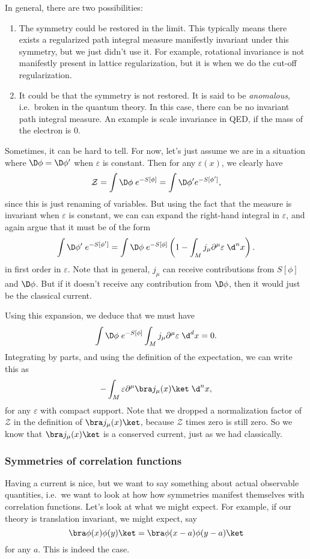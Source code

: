 \documentclass[a4paper]{article}
\begin{document}
In general, there are two possibilities:
\begin{enumerate}
  \item The symmetry could be restored in the limit. This typically means there exists a regularized path integral measure manifestly invariant under this symmetry, but we just didn't use it. For example, rotational invariance is not manifestly present in lattice regularization, but it is when we do the cut-off regularization.
  \item It could be that the symmetry is not restored. It is said to be \emph{anomalous}, i.e.\ broken in the quantum theory. In this case, there can be no invariant path integral measure. An example is scale invariance in QED, if the mass of the electron is $0$.
\end{enumerate}
Sometimes, it can be hard to tell. For now, let's just assume we are in a situation where $\D \phi = \D \phi'$ when $\varepsilon$ is constant. Then for any $\varepsilon(x)$, we clearly have
\[
  \mathcal{Z} = \int \D \phi\; e^{-S [\phi]} = \int \D \phi' e^{-S[\phi']},
\]
since this is just renaming of variables. But using the fact that the measure is invariant when $\varepsilon$ is constant, we can can expand the right-hand integral in $\varepsilon$, and again argue that it must be of the form
\[
  \int \D \phi'\; e^{-S[\phi']} = \int \D \phi\; e^{-S[\phi]} \left(1 - \int_M j_\mu \partial^\mu \varepsilon\; \d^n x\right).
\]
in first order in $\varepsilon$. Note that in general, $j_\mu$ can receive contributions from $S[\phi]$ and $\D \phi$. But if it doesn't receive any contribution from $\D \phi$, then it would just be the classical current.

Using this expansion, we deduce that we must have
\[
  \int \D \phi \; e^{-S[\phi]} \int_M j_\mu \partial^\mu \varepsilon \;\d^d x = 0.
\]
Integrating by parts, and using the definition of the expectation, we can write this as
\[
  -\int_M \varepsilon \partial^\mu \bra j_\mu (x)\ket\; \d^n x,
\]
for any $\varepsilon$ with compact support. Note that we dropped a normalization factor of $\mathcal{Z}$ in the definition of $\bra j_\mu(x)\ket$, because $\mathcal{Z}$ times zero is still zero. So we know that $\bra j_\mu (x)\ket$ is a conserved current, just as we had classically.

\subsubsection*{Symmetries of correlation functions}
Having a current is nice, but we want to say something about actual observable quantities, i.e.\ we want to look at how how symmetries manifest themselves with correlation functions. Let's look at what we might expect. For example, if our theory is translation invariant, we might expect, say
\[
  \bra \phi(x) \phi(y)\ket = \bra \phi(x - a) \phi(y - a)\ket
\]
for any $a$. This is indeed the case.
\end{document}
